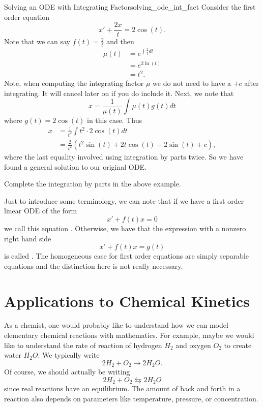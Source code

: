         \begin{ex}{Solving an ODE with Integrating Factor}{solving_ode_int_fact}
            Consider the first order equation
            \[
            x'+\frac{2x}{t}=2\cos(t).
            \]
            Note that we can say $f(t)=\frac{2}{t}$ and then 
            \begin{align*}
            \mu(t)&=e^{\int \frac{2}{t}dt}\\
            &= e^{2\ln(t)}\\
            &=t^2.
            \end{align*}
            Note, when computing the integrating factor $\mu$ we do not need to have a $+c$ after integrating. It will cancel later on if you do include it. Next, we note that
            \[
            x=\frac{1}{\mu(t)} \int \mu(t) g(t)dt
            \]
            where $g(t)=2\cos(t)$ in this case.  Thus
            \begin{align*}
                x&=\frac{1}{t^2} \int t^2 \cdot 2\cos(t)dt\\
                &=\frac{2}{t^2} \left(t^2\sin(t)+2t\cos(t)-2\sin(t)+c\right),
            \end{align*}
            where the last equality involved using integration by parts twice.  So we have found a general solution to our original ODE.
        \end{ex}
        
        \begin{exercise}
            Complete the integration by parts in the above example.
        \end{exercise}
        
        Just to introduce some terminology, we can note that if we have a first order linear ODE of the form
        \[
        x'+f(t)x=0
        \]
        we call this equation .  Otherwise, we have that the expression with a nonzero right hand side
        \[
        x'+ f(t)x=g(t)
        \]
        is called .  The homogeneous case for first order equations are simply separable equations and the distinction here is not really necessary.
        
        \section{Applications to Chemical Kinetics}
        As a chemist, one would probably like to understand how we can model elementary chemical reactions with mathematics.  For example, maybe we would like to understand the rate of reaction of hydrogen $H_2$ and oxygen $O_2$ to create water $H_2 O$. We typically write
        \[
        2H_2 + O_2 \to 2H_2O.
        \]
        \noindent Of course, we should actually be writing
        \[
        2H_2 + O_2 \leftrightarrows 2H_2O
        \]
        since real reactions have an equilibrium.  The amount of back and forth in a reaction also depends on parameters like temperature, pressure, or concentration.

